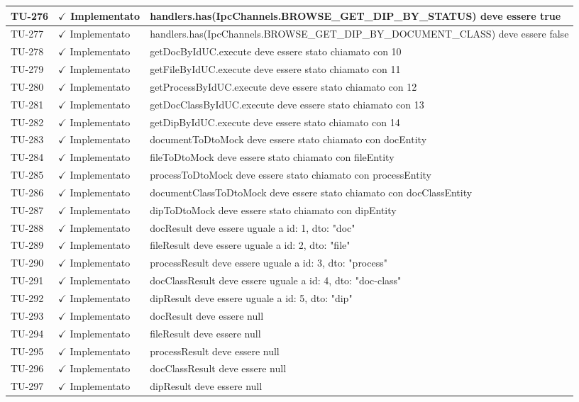 ﻿\documentclass[a4paper,12pt]{article}
\newcommand{\ok}{\textcolor{green!60!black}{$\checkmark$ Implementato}}
\begin{document}
\begin{longtable}{|p{2cm}|p{3.5cm}|p{9.5cm}|}
\hline
TU-276 & \ok & handlers.has(IpcChannels.BROWSE\_GET\_DIP\_BY\_STATUS) deve essere true \\
\hline
TU-277 & \ok & handlers.has(IpcChannels.BROWSE\_GET\_DIP\_BY\_DOCUMENT\_CLASS) deve essere false \\
\hline
TU-278 & \ok & getDocByIdUC.execute deve essere stato chiamato con 10 \\
\hline
TU-279 & \ok & getFileByIdUC.execute deve essere stato chiamato con 11 \\
\hline
TU-280 & \ok & getProcessByIdUC.execute deve essere stato chiamato con 12 \\
\hline
TU-281 & \ok & getDocClassByIdUC.execute deve essere stato chiamato con 13 \\
\hline
TU-282 & \ok & getDipByIdUC.execute deve essere stato chiamato con 14 \\
\hline
TU-283 & \ok & documentToDtoMock deve essere stato chiamato con docEntity \\
\hline
TU-284 & \ok & fileToDtoMock deve essere stato chiamato con fileEntity \\
\hline
TU-285 & \ok & processToDtoMock deve essere stato chiamato con processEntity \\
\hline
TU-286 & \ok & documentClassToDtoMock deve essere stato chiamato con docClassEntity \\
\hline
TU-287 & \ok & dipToDtoMock deve essere stato chiamato con dipEntity \\
\hline
TU-288 & \ok & docResult deve essere uguale a { id: 1, dto: "doc" } \\
\hline
TU-289 & \ok & fileResult deve essere uguale a { id: 2, dto: "file" } \\
\hline
TU-290 & \ok & processResult deve essere uguale a { id: 3, dto: "process" } \\
\hline
TU-291 & \ok & docClassResult deve essere uguale a { id: 4, dto: "doc-class" } \\
\hline
TU-292 & \ok & dipResult deve essere uguale a { id: 5, dto: "dip" } \\
\hline
TU-293 & \ok & docResult deve essere null \\
\hline
TU-294 & \ok & fileResult deve essere null \\
\hline
TU-295 & \ok & processResult deve essere null \\
\hline
TU-296 & \ok & docClassResult deve essere null \\
\hline
TU-297 & \ok & dipResult deve essere null \\

\end{longtable}
\end{document}
